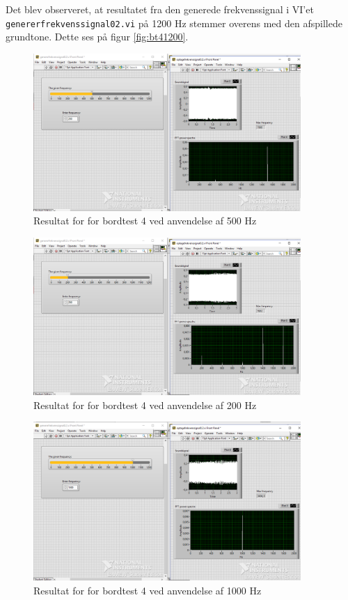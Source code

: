 			 Det blev observeret, at resultatet fra den generede frekvenssignal i VI'et \texttt{genererfrekvenssignal02.vi} på 1200 Hz stemmer overens med den afspillede grundtone. Dette ses på figur \ref{fig:bt41200}.  
			 
			\begin{figure}[htb]
			\centering
				\includegraphics[width=4in]{Bordtest4500Hz}
				\caption{Resultat for for bordtest 4 ved anvendelse af 500 Hz}	
				\label{fig:bt4500}
			\end{figure} 
			
			\begin{figure}[htb]
			\centering
				\includegraphics[width=4in]{Bordtest4200Hz}
				\caption{Resultat for for bordtest 4 ved anvendelse af 200 Hz}	
				\label{fig:bt4200}
			\end{figure} 
			
			\begin{figure}[htb]
			\centering
				\includegraphics[width=4in]{Bordtest41000Hz}
				\caption{Resultat for for bordtest 4 ved anvendelse af 1000 Hz}	
				\label{fig:bt41000}
			\end{figure} 
			
